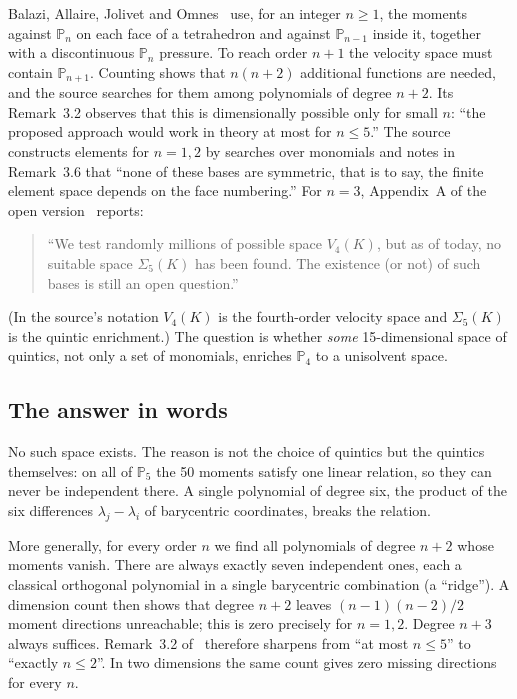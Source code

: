 \documentclass[11pt,a4paper]{article}
\theoremstyle{definition}
\theoremstyle{remark}
\newcommand{\Pol}{\mathbb P}
\begin{document}
Balazi, Allaire, Jolivet and Omnes~\cite{BAJO2025} use, for an integer
\(n\ge1\), the moments against \(\Pol_n\) on each face of a tetrahedron
and against \(\Pol_{n-1}\) inside it, together with a discontinuous
\(\Pol_n\) pressure. To reach order \(n+1\) the velocity space must
contain \(\Pol_{n+1}\). Counting shows that \(n(n+2)\) additional
functions are needed, and the source searches for them among
polynomials of degree \(n+2\). Its Remark~3.2 observes that this is
dimensionally possible only for small \(n\): ``the proposed approach would
work in theory at most for \(n\le5\).'' The source constructs elements for
\(n=1,2\) by searches over monomials and notes in Remark~3.6 that ``none of
these bases are symmetric, that is to say, the finite element space
depends on the face numbering.'' For \(n=3\), Appendix~A of the open
version~\cite{BAJO2025} reports:
\begin{quote}\small
``We test randomly millions of possible space \(V_4(K)\), but as of today, no
suitable space \(\Sigma_5(K)\) has been found. The existence (or not) of such bases
is still an open question.''
\end{quote}
(In the source's notation \(V_4(K)\) is the fourth-order velocity space
and \(\Sigma_5(K)\) is the quintic enrichment.) The question is whether
\emph{some} 15-dimensional space of quintics, not only a set of
monomials, enriches \(\Pol_4\) to a unisolvent space.

\subsection{The answer in words}

No such space exists. The reason is not the choice of quintics but the
quintics themselves: on all of \(\Pol_5\) the 50 moments satisfy one
linear relation, so they can never be independent there. A single
polynomial of degree six, the product of the six differences
\(\lambda_j-\lambda_i\) of barycentric coordinates, breaks the relation.

More generally, for every order \(n\) we find all polynomials of degree
\(n+2\) whose moments vanish. There are always exactly seven
independent ones, each a classical orthogonal polynomial in a single
barycentric combination (a ``ridge''). A dimension count then shows
that degree \(n+2\) leaves \((n-1)(n-2)/2\) moment directions unreachable;
this is zero precisely for \(n=1,2\). Degree \(n+3\) always suffices.
Remark~3.2 of~\cite{BAJO2025} therefore sharpens from ``at most
\(n\le5\)'' to ``exactly \(n\le2\)''. In two dimensions the same count
gives zero missing directions for every \(n\).
\end{document}
